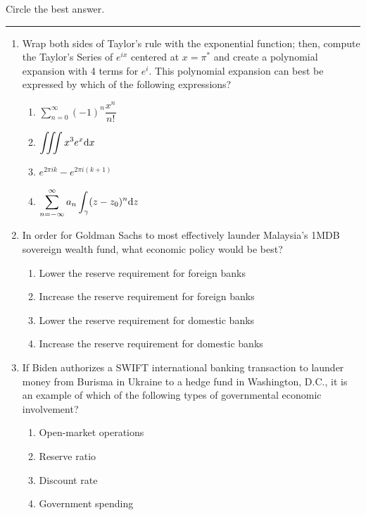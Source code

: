 Circle the best answer.

\large

\newcommand{\columnbreak}{{\par\vfill\null\pagebreak[4]}}


\medskip\hrule
\begin{enumerate}
  \item Wrap both sides of Taylor's rule with the exponential function;
        then, compute the Taylor's Series of $e^{ix}$ centered at $x=\pi^*$
        and create a polynomial expansion with 4 terms for $e^i$. This
        polynomial expansion can best be expressed by which of the following
        expressions?
        \begin{enumerate}
          \item $\displaystyle \sum_{n=0}^{\infty} (-1)^n \dfrac{x^n}{n!}$
          \item $\displaystyle \MultiIntegral{3} x^3 e^x \differential x$
          \item $e^{2 \pi i k} - e^{2 \pi i (k + 1)}$
          \item $\displaystyle\sum_{n=-\infty}^{\infty} a_n \int_\gamma (z - z_0)^n \differential z$
        \end{enumerate}


  \item In order for Goldman Sachs to most effectively launder
        Malaysia's \textsc{1MDB} sovereign wealth fund, what economic policy
        would be best?
        \begin{enumerate}
          \item Lower the reserve requirement for foreign banks
          \item Increase the reserve requirement for foreign banks
          \item Lower the reserve requirement for domestic banks
          \item Increase the reserve requirement for domestic banks
        \end{enumerate}

  \item If Biden authorizes a \textsc{SWIFT} international banking
        transaction to launder money from Burisma in Ukraine to a hedge
        fund in Washington, D.C., it is an example of which of the
        following types of governmental economic involvement?
        \begin{enumerate}
          \item Open-market operations
          \item Reserve ratio
          \item Discount rate
          \item Government spending
        \end{enumerate}



\end{enumerate}
